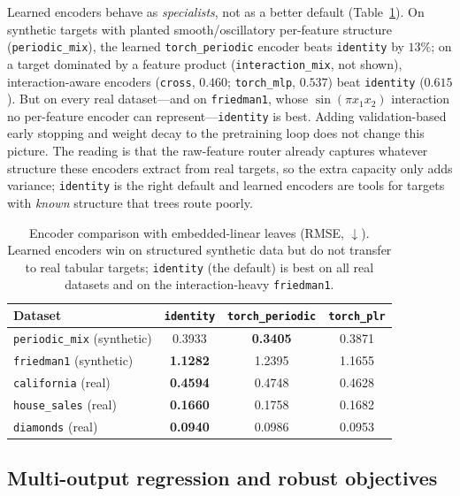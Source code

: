 \documentclass[11pt]{article}
\begin{document}
Learned encoders behave as \emph{specialists}, not as a better default
(Table~\ref{tab:encoders}). On synthetic targets with planted smooth/oscillatory
per-feature structure (\texttt{periodic\_mix}), the learned \texttt{torch\_periodic}
encoder beats \texttt{identity} by $13\%$; on a target dominated by a feature product
(\texttt{interaction\_mix}, not shown), interaction-aware encoders (\texttt{cross},
$0.460$; \texttt{torch\_mlp}, $0.537$) beat \texttt{identity} ($0.615$). But on every real
dataset---and on \texttt{friedman1}, whose $\sin(\pi x_1 x_2)$ interaction no per-feature
encoder can represent---\texttt{identity} is best. Adding validation-based early stopping
and weight decay to the pretraining loop does not change this picture. The reading is that
the raw-feature router already captures whatever structure these encoders extract from
real targets, so the extra capacity only adds variance; \texttt{identity} is the right
default and learned encoders are tools for targets with \emph{known} structure that trees
route poorly.

\begin{table}[t]
\centering
\caption{Encoder comparison with embedded-linear leaves (RMSE, $\downarrow$). Learned
encoders win on structured synthetic data but do not transfer to real tabular targets;
\texttt{identity} (the default) is best on all real datasets and on the interaction-heavy
\texttt{friedman1}.}
\label{tab:encoders}
\begin{tabular}{lccc}
\toprule
Dataset & \texttt{identity} & \texttt{torch\_periodic} & \texttt{torch\_plr} \\
\midrule
\texttt{periodic\_mix} (synthetic) & 0.3933 & \textbf{0.3405} & 0.3871 \\
\texttt{friedman1} (synthetic)     & \textbf{1.1282} & 1.2395 & 1.1655 \\
\texttt{california} (real)         & \textbf{0.4594} & 0.4748 & 0.4628 \\
\texttt{house\_sales} (real)       & \textbf{0.1660} & 0.1758 & 0.1682 \\
\texttt{diamonds} (real)           & \textbf{0.0940} & 0.0986 & 0.0953 \\
\bottomrule
\end{tabular}
\end{table}

\subsection{Multi-output regression and robust objectives}
\label{sec:exp-multioutput}
\end{document}
